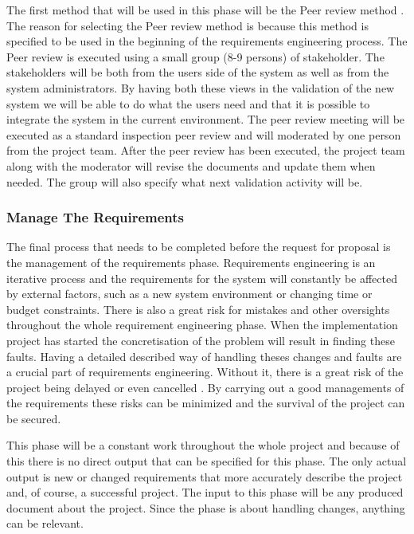 \documentclass[a4paper]{article}
\begin{document}
The first method that will be used in this phase will be the Peer review method \cite{gott263269}. The reason for selecting the Peer review method is because this method is specified to be used in the beginning of the requirements engineering process\cite{gott280}. The Peer review is executed using a small group (8-9 persons) of stakeholder. The stakeholders will be both from the users side of the system as well as from the system administrators. By having both these views in the validation of the new system we will be able to do what the users need and that it is possible to integrate the system in the current environment. The peer review meeting will be executed as a standard inspection peer review and will moderated by one person from the project team. After the peer review has been executed, the project team along with the moderator will revise the documents and update them when needed. The group will also specify what next validation activity will be.

\subsubsection{Manage The Requirements}
\label{subsub:manage_the_requirements}
The final process that needs to be completed before the request for proposal is the management of the requirements phase. Requirements engineering is an iterative process and the requirements for the system will constantly be affected by external factors, such as a new system environment or changing time or budget constraints. There is also a great risk for mistakes and other oversights throughout the whole requirement engineering phase. When the implementation project has started the concretisation of the problem will result in finding these faults. Having a detailed described way of handling theses changes and faults are a crucial part of requirements engineering\cite{gott281}. Without it, there is a great risk of the project being delayed or even cancelled \cite{gott281}. By carrying out a good managements of the requirements these risks can be minimized and the survival of the project can be secured. 

This phase will be a constant work throughout the whole project and because of this there is no direct output that can be specified for this phase. The only actual output is new or changed requirements that more accurately describe the project and, of course, a successful project. The input to this phase will be any produced document about the project. Since the phase is about handling changes, anything can be relevant.
\end{document}
